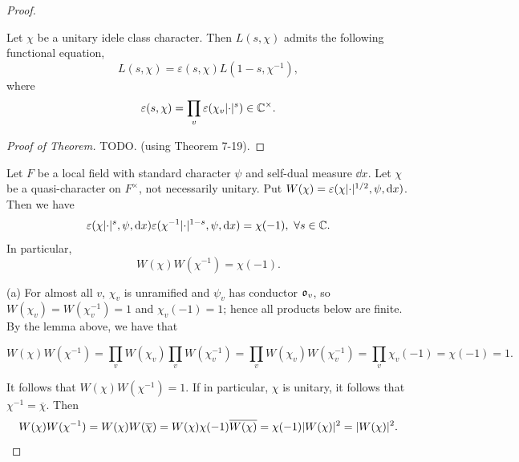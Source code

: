 \begin{proof}
  \begin{theorem}
    Let $\chi$ be a unitary idele class character. Then $L(s, \chi)$ admits the following
    functional equation,
    \begin{equation}
      L(s, \chi) = \varepsilon(s, \chi) L(1 -s, \chi^{-1}),
      \label{eq:fun_eq_L}
    \end{equation}
    where
    \[\varepsilon(s, \chi) = \prod_{v} \varepsilon(\chi_v \lvert\cdot\rvert^s) \in \mathbb{C} ^\times.  \]
    \label{thm: global_fun_eq}
  \end{theorem}
  \begin{proof}[Proof of Theorem]
    TODO. (using Theorem 7-19).
  \end{proof}

  \begin{lemma}
    Let $F$ be a local field with standard character $\psi$ and self-dual measure $\dd x$.
    Let $\chi$ be a quasi-character on $F^\times$, not necessarily unitary. Put
    $W(\chi) = \varepsilon(\chi \lvert\cdot\rvert^{1/2}, \psi, \mathop{}\!\mathrm{d} x)$.
    Then we have
    \[ \varepsilon(\chi\abs{\cdot}^s, \psi, \dd x) \varepsilon(\chi^{-1}\abs{\cdot}^{1-s}, \psi, \dd x) = \chi(-1), \ \forall s \in \CC.  \]
    In particular,
    \[W(\chi) W(\chi^{-1}) = \chi(-1).  \]
  \end{lemma}

  (a)
  For almost all $v$, $\chi_v$ is unramified and $\psi_v$ has conductor $\mathfrak{o}_v$,
  so $W(\chi_v)=W(\chi_v^{-1})=1$ and $\chi_v(-1)=1$; hence all products below are finite.
  By the lemma above, we have that

  \[W(\chi) W(\chi^{-1}) = \prod_{v} W(\chi_v) \prod_{v} W(\chi_v^{-1}) =
  \prod_{v} W(\chi_v)W(\chi_v^{-1}) = \prod_{v} \chi_v(-1) = \chi(-1) = 1.  \]



  It follows that $W(\chi)W(\chi^{-1}) = 1$. If in particular, $\chi$ is unitary, it follows that
  $\chi^{-1} = \overline{\chi}$. Then
  \[W(\chi) W(\chi^{-1}) = W(\chi) W(\overline{\chi}) = W(\chi) \chi(-1) \overline{W(\chi)} =
  \chi(-1) \lvert W(\chi)\rvert^2 = \lvert W(\chi)\rvert^2.  \]


\end{proof}
